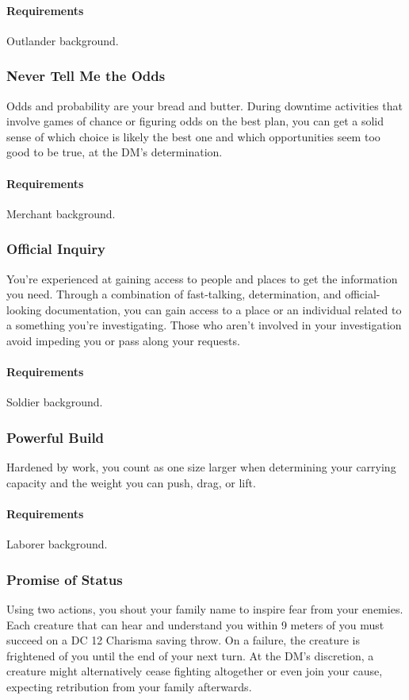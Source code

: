     \paragraph{Requirements} Outlander background.
\subsubsection{Never Tell Me the Odds} \label{feat::nevertellmetheodds}
    Odds and probability are your bread and butter.
    During downtime activities that involve games of chance or figuring odds on the best plan, you can get a solid sense of which choice is likely the best one and which opportunities seem too good to be true, at the DM's determination.
    \paragraph{Requirements} Merchant background.
\subsubsection{Official Inquiry} \label{feat::officialinquiry}
    You're experienced at gaining access to people and places to get the information you need.
    Through a combination of fast-talking, determination, and official-looking documentation, you can gain access to a place or an individual related to a something you're investigating.
    Those who aren't involved in your investigation avoid impeding you or pass along your requests.
    \paragraph{Requirements} Soldier background.
\subsubsection{Powerful Build} \label{feat::powerfulbuild}
    Hardened by work, you count as one size larger when determining your carrying capacity and the weight you can push, drag, or lift.
    \paragraph{Requirements} Laborer background.
\subsubsection{Promise of Status} \label{feat::promiseofstatus}
    Using two actions, you shout your family name to inspire fear from your enemies.
    Each creature that can hear and understand you within 9 meters of you must succeed on a DC 12 Charisma saving throw.
    On a failure, the creature is frightened of you until the end of your next turn.
    At the DM's discretion, a creature might alternatively cease fighting altogether or even join your cause, expecting retribution from your family afterwards.

